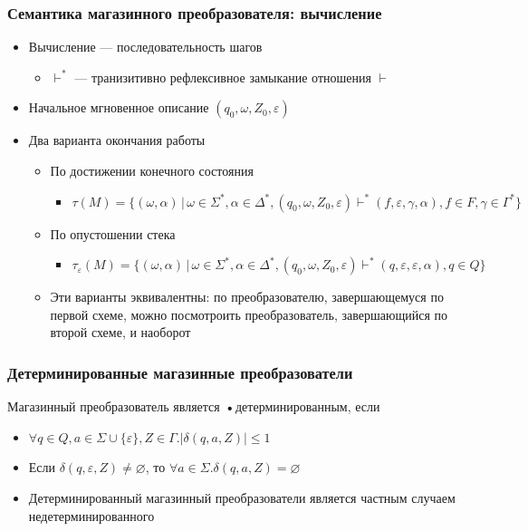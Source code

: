 \documentclass{beamer}
\begin{document}
\begin{frame}[fragile]
  \transwipe[direction=90]
  \frametitle{Семантика магазинного преобразователя: вычисление}
  \begin{itemize}
    \item Вычисление --- последовательность шагов
    \begin{itemize}
      \item $\vdash^*$ --- транизитивно рефлексивное замыкание отношения $\vdash$
    \end{itemize}
    \item Начальное мгновенное описание $(q_0, \omega, Z_0, \varepsilon)$
    \item Два варианта окончания работы
    \begin{itemize}
      \item По достижении конечного состояния
      \begin{itemize}
        \item $\tau(M) = \{ (\omega, \alpha) \, | \, \omega \in  \Sigma^*, \alpha \in \Delta^*, (q_0, \omega, Z_0, \varepsilon) \vdash^* (f, \varepsilon, \gamma, \alpha), f \in F, \gamma \in \Gamma^* \}$
      \end{itemize}
      \item По опустошении стека
      \begin{itemize}
      	\item $\tau_{\varepsilon}(M) = \{ (\omega, \alpha) \, | \, \omega \in  \Sigma^*, \alpha \in \Delta^*, (q_0, \omega, Z_0, \varepsilon) \vdash^* (q, \varepsilon, \varepsilon, \alpha), q \in Q\}$
      \end{itemize}
      \item Эти варианты эквивалентны: по преобразователю, завершающемуся по первой схеме, можно посмотроить преобразователь, завершающийся по второй схеме, и наоборот
    \end{itemize}

  \end{itemize}
\end{frame}

\begin{frame}[fragile]
  \transwipe[direction=90]
  \frametitle{Детерминированные магазинные преобразователи}
  Магазинный преобразователь является \textbf{•}{детерминированным}, если
\begin{itemize}
	\item $\forall q \in Q, a \in \Sigma \cup \{ \varepsilon \}, Z \in \Gamma. | \delta(q, a, Z) | \leq 1$
	\item Если $ \delta(q, \varepsilon, Z) \neq \varnothing$, то $\forall a \in \Sigma. \delta(q, a, Z) = \varnothing$
	\item Детерминированный магазинный преобразователи является частным случаем недетерминированного
\end{itemize}
\end{frame}
\end{document}
